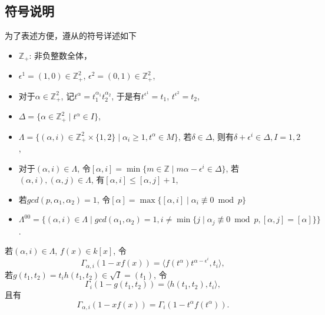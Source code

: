 \subsection{符号说明} %
\label{subsec:符号}
为了表述方便，遵从\cite{MR86f:18017}的符号详述如下\\
\begin{itemize}
	\item $\mathbb{Z}_+$: 非负整数全体， 
	\item $\epsilon^1 = (1,0)\in \mathbb{Z}_+^2$, $\epsilon^2 = (0,1)\in \mathbb{Z}_+^2$,
	\item 对于$\alpha \in \mathbb{Z}_+^2$, 记$t^{\alpha}=t_1^{\alpha_1}t_2^{\alpha_2}$, 于是有$t^{\epsilon^1}=t_1$, $t^{\epsilon^2}=t_2$,
	\item $\Delta=\{\alpha\in\mathbb{Z}_+^2\mid  t^{\alpha}\in I\}$,
	\item $\Lambda=\{(\alpha,i)\in\mathbb{Z}_+^2 \times \{1,2\}\mid  \alpha_i\geq 1, t^{\alpha}\in M\}$, 若$\delta \in \Delta$, 则有$\delta+\epsilon^i \in \Delta, I=1,2$,
	\item 对于$(\alpha,i)\in\Lambda$, 令$[\alpha,i]=\min\{m\in \mathbb{Z}\mid m\alpha - \epsilon^i\in \Delta\}$, %
	若$(\alpha,i),(\alpha,j)\in \Lambda$, 有$[\alpha,i]\leq [\alpha,j]+1$,
	\item 若$gcd(p,\alpha_1,\alpha_2)=1$, 令$[\alpha]=\max\{[\alpha,i]\mid  \alpha_i  \not\equiv 0 \bmod p\}$
	\item $\Lambda^{00}= \big\{(\alpha,i)\in \Lambda\mid  gcd(\alpha_1,\alpha_2)=1, i\neq \min\{j\mid \alpha_j\not\equiv 0 \bmod p, [\alpha,j]=[\alpha]\} \big\}$.
\end{itemize}
若$(\alpha,i)\in \Lambda$, $f(x)\in k[x]$, 令
\[\Gamma_{\alpha,i}(1-xf(x))= \langle f(t^\alpha)t^{\alpha-\epsilon^i},t_i \rangle,\]
若$g(t_1,t_2)=t_ih(t_1,t_2)\in \sqrt{I}=(t_1)$, 令
\[\Gamma_i(1-g(t_1,t_2))=\langle h(t_1,t_2),t_i \rangle,\]
且有
\[\Gamma_{\alpha,i}(1-xf(x))=\Gamma_i(1-t^{\alpha} f(t^{\alpha})).\]

